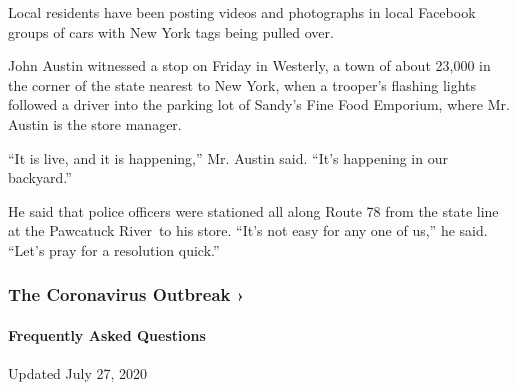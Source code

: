 Local residents have been posting videos and photographs in local
Facebook groups of cars with New York tags being pulled over.

John Austin witnessed a stop on Friday in Westerly, a town of about
23,000 in the corner of the state nearest to New York, when a trooper's
flashing lights followed a driver into the parking lot of Sandy's Fine
Food Emporium, where Mr. Austin is the store manager.

``It is live, and it is happening,'' Mr. Austin said. ``It's happening
in our backyard.''

He said that police officers were stationed all along Route 78 from the
state line at the Pawcatuck River~to his store. ``It's not easy for any
one of us,'' he said. ``Let's pray for a resolution quick.''

\href{https://www.nytimes.com/news-event/coronavirus?action=click\&pgtype=Article\&state=default\&region=MAIN_CONTENT_3\&context=storylines_faq}{}

\hypertarget{the-coronavirus-outbreak-}{%
\subsubsection{The Coronavirus Outbreak
›}\label{the-coronavirus-outbreak-}}

\hypertarget{frequently-asked-questions}{%
\paragraph{Frequently Asked
Questions}\label{frequently-asked-questions}}

Updated July 27, 2020

